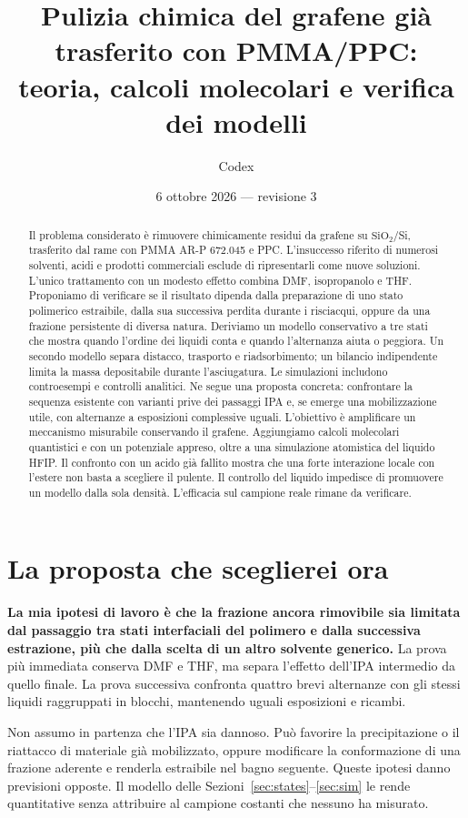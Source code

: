 \documentclass[11pt,reqno]{amsart}
\title[Grafene: teoria e calcoli molecolari della pulizia]{Pulizia chimica del grafene gi\`a trasferito con PMMA/PPC:\\ teoria, calcoli molecolari e verifica dei modelli}
\author{Codex}
\date{6 ottobre 2026 --- revisione 3}
\numberwithin{equation}{section}
\newcommand{\SiO}{\ensuremath{\mathrm{SiO}_2}}
\begin{document}
\begin{abstract}
Il problema considerato \`e rimuovere chimicamente residui da grafene
su \SiO/Si, trasferito dal rame con PMMA AR-P 672.045 e PPC.
L'insuccesso riferito di numerosi solventi, acidi e prodotti commerciali
esclude di ripresentarli come nuove soluzioni. L'unico trattamento con
un modesto effetto combina DMF, isopropanolo e THF. Proponiamo di
verificare se il risultato dipenda dalla preparazione di uno stato
polimerico estraibile, dalla sua successiva perdita durante i
risciacqui, oppure da una frazione persistente di diversa natura.
Deriviamo un modello conservativo a tre stati che mostra quando
l'ordine dei liquidi conta e quando l'alternanza aiuta o peggiora.
Un secondo modello separa distacco, trasporto e riadsorbimento;
un bilancio indipendente limita la massa depositabile durante
l'asciugatura. Le simulazioni includono controesempi e controlli
analitici. Ne segue una proposta concreta: confrontare la sequenza
esistente con varianti prive dei passaggi IPA e, se emerge una
mobilizzazione utile, con alternanze a esposizioni complessive uguali.
L'obiettivo \`e amplificare un meccanismo misurabile conservando il
grafene. Aggiungiamo calcoli molecolari quantistici e con un potenziale appreso, oltre a una simulazione atomistica del liquido HFIP. Il confronto con un acido gi\`a fallito mostra che una forte interazione locale con l'estere non basta a scegliere il pulente. Il controllo del liquido impedisce di promuovere un modello dalla sola densit\`a. L'efficacia sul campione reale rimane da verificare.
\end{abstract}
\maketitle

\section{La proposta che sceglierei ora}

\textbf{La mia ipotesi di lavoro \`e che la frazione ancora rimovibile
sia limitata dal passaggio tra stati interfaciali del polimero e dalla
successiva estrazione, pi\`u che dalla scelta di un altro solvente
generico.} La prova pi\`u immediata conserva DMF e THF, ma separa
l'effetto dell'IPA intermedio da quello finale. La prova successiva
confronta quattro brevi alternanze con gli stessi liquidi raggruppati
in blocchi, mantenendo uguali esposizioni e ricambi.

Non assumo in partenza che l'IPA sia dannoso. Pu\`o favorire la
precipitazione o il riattacco di materiale gi\`a mobilizzato, oppure
modificare la conformazione di una frazione aderente e renderla
estraibile nel bagno seguente. Queste ipotesi danno previsioni
opposte. Il modello delle Sezioni~\ref{sec:states}--\ref{sec:sim}
le rende quantitative senza attribuire al campione costanti che
nessuno ha misurato.
\end{document}
